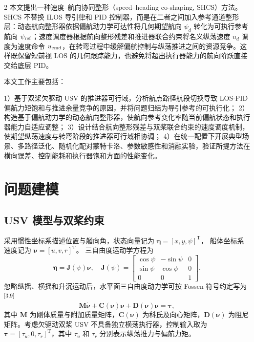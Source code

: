\documentclass[authordraft]{ctacn}
\begin{document}
\begin{multicols}{2}
本文提出一种速度–航向协同整形（speed–heading co-shaping, SHCS）方法。SHCS 不替换 ILOS 导引律和 PID 控制器，而是在二者之间加入参考通道整形层：动态航向整形器依据偏航动力学可达性将几何期望航向 $\psi_d$ 转化为可执行参考航向 $\psi_{\rm ref}$；速度调度器根据航向整形残差和推进器联合约束将名义纵荡速度 $u_d$ 调度为速度命令 $u_{\rm cmd}$，在转弯过程中缓解偏航控制与纵荡推进之间的资源竞争。这样既保留短前视 LOS 的几何跟踪能力，也避免将超出执行器能力的航向阶跃直接交给底层 PID。



本文工作主要包括：

1）基于双桨欠驱动 USV 的推进器可行域，分析航点路径航段切换导致 LOS-PID 偏航力矩饱和与推进余量竞争的原因，并将问题归结为导引参考的可执行化；
2）构造基于偏航动力学的动态航向整形器，使航向参考变化率随当前偏航状态和执行器能力自适应调整；
3）设计结合航向整形残差与双桨联合约束的速度调度机制，使期望纵荡速度与转弯阶段的推进器可行域相协调；
4）在统一配置下开展典型场景、多路径泛化、随机化配对蒙特卡洛、参数敏感性和消融实验，验证所提方法在横向误差、控制能耗和执行器饱和方面的性能变化。

\section{问题建模}
\subsection{USV 模型与双桨约束}
采用惯性坐标系描述位置与艏向角，状态向量记为 $\boldsymbol{\eta}=[x,y,\psi]^{\mathrm T}$，
船体坐标系速度记为 $\boldsymbol{\nu}=[u,v,r]^{\mathrm T}$。
三自由度运动学方程为
\begin{equation}
\dot{\boldsymbol{\eta}}=\boldsymbol{J}(\psi)\boldsymbol{\nu},
\quad
\boldsymbol{J}(\psi)=
\begin{bmatrix}
\cos\psi & -\sin\psi & 0\\
\sin\psi &  \cos\psi & 0\\
0 & 0 & 1
\end{bmatrix}.
\label{eq:kinematics}
\end{equation}
忽略纵摇、横摇和升沉运动后，水平面三自由度动力学可按 Fossen 符号约定写为\textsuperscript{[3,9]}
\begin{equation}
\boldsymbol{M}\dot{\boldsymbol{\nu}}
+\boldsymbol{C}(\boldsymbol{\nu})\boldsymbol{\nu}
+\boldsymbol{D}(\boldsymbol{\nu})\boldsymbol{\nu}
=\boldsymbol{\tau},
\label{eq:dynamics}
\end{equation}
其中 $\boldsymbol{M}$ 为刚体质量与附加质量矩阵，$\boldsymbol{C}(\boldsymbol{\nu})$ 为科氏及向心矩阵，$\boldsymbol{D}(\boldsymbol{\nu})$ 为阻尼矩阵。考虑欠驱动双桨 USV 不具备独立横荡执行器，控制输入取为 $\boldsymbol{\tau}=[\tau_u,0,\tau_r]^{\mathrm T}$，其中 $\tau_u$ 和 $\tau_r$ 分别表示纵荡推力与偏航力矩。


\end{multicols}
\end{document}

